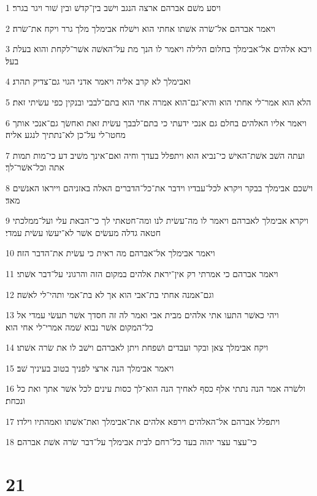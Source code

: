 \par 1 ויסע משׁם אברהם ארצה הנגב וישׁב בין־קדשׁ ובין שׁור ויגר בגרר׃
\par 2 ויאמר אברהם אל־שׂרה אשׁתו אחתי הוא וישׁלח אבימלך מלך גרר ויקח את־שׂרה׃
\par 3 ויבא אלהים אל־אבימלך בחלום הלילה ויאמר לו הנך מת על־האשׁה אשׁר־לקחת והוא בעלת בעל׃
\par 4 ואבימלך לא קרב אליה ויאמר אדני הגוי גם־צדיק תהרג׃
\par 5 הלא הוא אמר־לי אחתי הוא והיא־גם־הוא אמרה אחי הוא בתם־לבבי ובנקין כפי עשׂיתי זאת׃
\par 6 ויאמר אליו האלהים בחלם גם אנכי ידעתי כי בתם־לבבך עשׂית זאת ואחשׂך גם־אנכי אותך מחטו־לי על־כן לא־נתתיך לנגע אליה׃
\par 7 ועתה השׁב אשׁת־האישׁ כי־נביא הוא ויתפלל בעדך וחיה ואם־אינך משׁיב דע כי־מות תמות אתה וכל־אשׁר־לך׃
\par 8 וישׁכם אבימלך בבקר ויקרא לכל־עבדיו וידבר את־כל־הדברים האלה באזניהם וייראו האנשׁים מאד׃
\par 9 ויקרא אבימלך לאברהם ויאמר לו מה־עשׂית לנו ומה־חטאתי לך כי־הבאת עלי ועל־ממלכתי חטאה גדלה מעשׂים אשׁר לא־יעשׂו עשׂית עמדי׃
\par 10 ויאמר אבימלך אל־אברהם מה ראית כי עשׂית את־הדבר הזה׃
\par 11 ויאמר אברהם כי אמרתי רק אין־יראת אלהים במקום הזה והרגוני על־דבר אשׁתי׃
\par 12 וגם־אמנה אחתי בת־אבי הוא אך לא בת־אמי ותהי־לי לאשׁה׃
\par 13 ויהי כאשׁר התעו אתי אלהים מבית אבי ואמר לה זה חסדך אשׁר תעשׂי עמדי אל כל־המקום אשׁר נבוא שׁמה אמרי־לי אחי הוא׃
\par 14 ויקח אבימלך צאן ובקר ועבדים ושׁפחת ויתן לאברהם וישׁב לו את שׂרה אשׁתו׃
\par 15 ויאמר אבימלך הנה ארצי לפניך בטוב בעיניך שׁב׃
\par 16 ולשׂרה אמר הנה נתתי אלף כסף לאחיך הנה הוא־לך כסות עינים לכל אשׁר אתך ואת כל ונכחת׃
\par 17 ויתפלל אברהם אל־האלהים וירפא אלהים את־אבימלך ואת־אשׁתו ואמהתיו וילדו׃
\par 18 כי־עצר עצר יהוה בעד כל־רחם לבית אבימלך על־דבר שׂרה אשׁת אברהם׃

\chapter{21}

